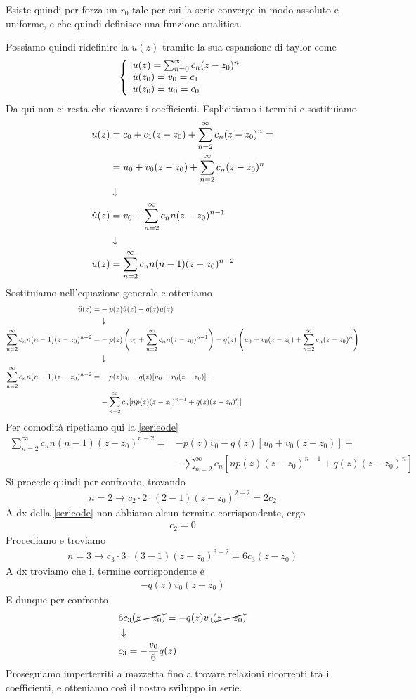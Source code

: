Esiste quindi per forza un $r_0$ tale per cui la serie converge in modo assoluto e uniforme, e che quindi definisce una funzione analitica.

Possiamo quindi ridefinire la $u(z)$ tramite la sua espansione di taylor come
\begin{align}
	\triple{u(z) = \sum_{n=0}^{\infty} c_n(z-z_0)^n}{\dot{u}(z_0) = v_0 = c_1 \hfill}{u(z_0) = u_0 = c_0 \hfill}
\end{align}
Da qui non ci resta che ricavare i coefficienti. Esplicitiamo i termini e sostituiamo
\begin{align}
       u(z) &= c_0 + c_1 (z-z_0) + \sum_{n=2}^{\infty} c_n(z-z_0)^n = \nonumber \\
            &= u_0 + v_0 (z-z_0) + \sum_{n=2}^{\infty} c_n(z-z_0)^n \\ &\downarrow \nonumber \\
 \dot{u}(z) &= v_0 + \sum_{n=2}^{\infty} c_n n(z-z_0)^{n-1} \\ &\downarrow \nonumber \\
\ddot{u}(z) &= \sum_{n=2}^{\infty} c_n n(n-1)(z-z_0)^{n-2}
\end{align}
Sostituiamo nell'equazione generale e otteniamo
\begin{align}
	\ddot{u}(z) =& - p(z) \dot{u}(z) - q(z) u(z) \\ &\downarrow \nonumber \\
	\sum_{n=2}^{\infty} c_n n(n-1)(z-z_0)^{n-2} =& -p(z) \left(v_0 + \sum_{n=2}^{\infty} c_n n(z-z_0)^{n-1}\right) - q(z) \left( u_0 + v_0 (z-z_0) + \sum_{n=2}^{\infty} c_n(z-z_0)^n \right) \nonumber \\ &\downarrow \nonumber \\
	\sum_{n=2}^{\infty} c_n n(n-1)(z-z_0)^{n-2} =& -p(z)v_0 - q(z)[u_0 + v_0 (z-z_0) ] + \nonumber\\ 
	&- \sum_{n=2}^{\infty} c_n [np(z)(z-z_0)^{n-1} + q(z)(z-z_0)^n] \label{serieode}
\end{align}
\newpage
Per comodità ripetiamo qui la \ref{serieode}
\begin{align}
	\sum_{n=2}^{\infty} c_n n(n-1)(z-z_0)^{n-2} =& -p(z)v_0 - q(z)[u_0 + v_0 (z-z_0) ] + \nonumber\\ 
	&- \sum_{n=2}^{\infty} c_n [np(z)(z-z_0)^{n-1} + q(z)(z-z_0)^n]
\end{align}
Si procede quindi per confronto, trovando
\begin{align}
	n = 2 \to c_2 \cdot 2 \cdot (2-1) (z-z_0)^{2-2} = 2c_2
\end{align}
A dx della \ref{serieode} non abbiamo alcun termine corrispondente, ergo
\begin{align}
	c_2 = 0
\end{align}
Procediamo e troviamo
\begin{align}
	n = 3 \to c_3 \cdot 3 \cdot (3-1) (z-z_0)^{3-2} = 6c_3 (z-z_0)
\end{align}
A dx troviamo che il termine corrispondente è
\begin{align}
	- q(z)v_0 (z-z_0)
\end{align}
E dunque per confronto
\begin{align}
	&6c_3 \cancel{(z-z_0)} = - q(z)v_0 \cancel{(z-z_0)}\\ &\downarrow \nonumber \\
	&c_3 = -\frac{v_0}{6}q(z) 
\end{align}
Proseguiamo imperterriti a mazzetta fino a trovare relazioni ricorrenti tra i coefficienti, e otteniamo così il  nostro sviluppo in serie.


